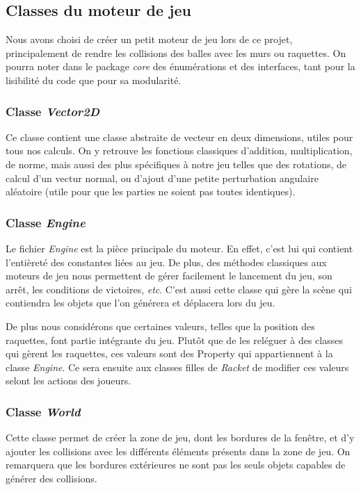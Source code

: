 \documentclass[a4paper,10pt]{article}
\theoremstyle{definition}
\begin{document}
    \subsection{Classes du moteur de jeu}
    Nous avons choisi de créer un petit moteur de jeu lors de ce projet, principalement de rendre les collisions des balles avec les murs ou raquettes. On pourra noter dans le package \emph{core} des énumérations et des interfaces, tant pour la lisibilité du code que pour sa modularité.
    	
	\subsubsection*{Classe \emph{Vector2D}}
	Ce classe contient une classe abstraite de vecteur en deux dimensions, utiles pour tous nos calculs. On y retrouve les fonctions classiques d'addition, multiplication, de norme, mais aussi des plus spécifiques à notre jeu telles que des rotations, de calcul d'un vectur normal, ou d'ajout d'une petite perturbation angulaire aléatoire (utile pour que les parties ne soient pas toutes identiques).
	
	\subsubsection*{Classe \emph{Engine}}
	Le fichier \emph{Engine} est la pièce principale du moteur. En effet, c'est lui qui contient l'entièreté des constantes liées au jeu. De plus, des méthodes classiques aux moteurs de jeu nous permettent de gérer facilement le lancement du jeu, son arrêt, les conditions de victoires, \emph{etc}. C'est aussi cette classe qui gère la scène qui contiendra les objets que l'on générera et déplacera lors du jeu.
	
	De plus nous considérons que certaines valeurs, telles que la position des raquettes, font partie intégrante du jeu. Plutôt que de les reléguer à des classes qui gèrent les raquettes, ces valeurs sont des \og Property \fg qui appartiennent à la classe \emph{Engine}. Ce sera ensuite aux classes filles de \emph{Racket} de modifier ces valeurs selont les actions des joueurs.
        \subsubsection*{Classe \emph{World}}
        Cette classe permet de créer la zone de jeu, dont les bordures de la fenêtre, et d'y ajouter les collisions avec les différents éléments présents dans la zone de jeu. On remarquera que les bordures extérieures ne sont pas les seuls objets capables de générer des collisions. 
        
\end{document}
